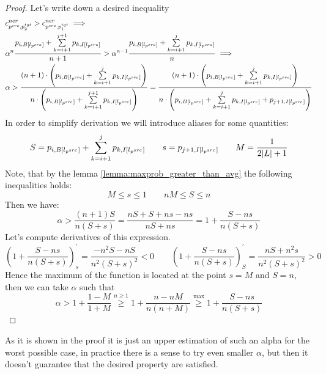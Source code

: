 \begin{proof} Let's write down a desired inequality
    \begin{align*}
         & c_{p^{src}, p_2^{tgt}}^{ner} > c_{p^{src}, p_1^{tgt}}^{ner} \implies \\
         & \alpha^{n}
        \frac{
            p_{i, B[l_{p^{src}}]} +
            \sum\limits_{k = i + 1}^{j + 1} p_{k, I[l_{p^{src}}]}
        }
        {n + 1} >
        \alpha^{n - 1}
        \frac{
            p_{i, B[l_{p^{src}}]} +
            \sum\limits_{k = i + 1}^{j} p_{k, I[l_{p^{src}}]}
        }
        {n}
        \implies                                                                \\
         & \alpha >
        \frac
        {(n+1) \cdot \left( p_{i, B[l_{p^{src}}]} +
            \sum\limits_{k = i + 1}^{j} p_{k, I[l_{p^{src}}]} \right)}
        {
            n \cdot \left( p_{i, B[l_{p^{src}}]} +
            \sum\limits_{k = i + 1}^{j + 1} p_{k, I[l_{p^{src}}]} \right)}
        =
        \frac
        {(n+1) \cdot \left( p_{i, B[l_{p^{src}}]} +
            \sum\limits_{k = i + 1}^{j} p_{k, I[l_{p^{src}}]} \right)}
        {
            n \cdot \left( p_{i, B[l_{p^{src}}]} +
            \sum\limits_{k = i + 1}^{j} p_{k, I[l_{p^{src}}]} + p_{j+1, I[l_{p^{src}}]} \right)}
    \end{align*}
    In order to simplify derivation we will introduce aliases for some quantities:
    \[
        S = p_{i, B[l_{p^{src}}]}  + \sum\limits_{k = i + 1}^{j} p_{k, I[l_{p^{src}}]} \qquad
        s = p_{j+1, I[l_{p^{src}}]} \qquad
        M = \frac{1}{2|L| + 1}
    \]
    Note, that by the lemma \ref{lemma:maxprob_greater_than_avg} the following
    inequalities holds:
    \begin{equation} \label{eq:ner_sum_ineq}
        M \leq s \leq 1 \qquad nM \leq S \leq n
    \end{equation}
    Then we have:
    \begin{equation*}
        \alpha > \frac{(n + 1) S}{n (S + s)} =
        \frac{nS + S + ns - ns}{nS + ns} =
        1 + \frac{S - ns}{n(S + s)}
    \end{equation*}
    Let's compute derivatives of this expression.
    \begin{equation*}
        \left( 1 + \frac{S - ns}{n(S + s)} \right)_s^{'} =
        \frac{-n^2S - nS}{n^2 (S + s)^2} < 0
        \qquad
        \left( 1 + \frac{S - ns}{n(S + s)} \right)_S^{'}
        = \frac{nS + n^2s}{n^2 (S + s)^2} > 0
    \end{equation*}
    Hence the maximum of the function is located at the point
    \( s = M \) and \( S = n \), then we can take \( \alpha \) such that
    \begin{equation*}
        \alpha > 1 + \frac{1 - M}{1 + M}
        \stackrel{n \geq 1}{\geq}
        1 + \frac{n - nM}{n(n + M)}
        \stackrel{\max}{\geq}
        1 + \frac{S - ns}{n(S + s)}
    \end{equation*}
\end{proof}
As it is shown in the proof it is just an upper estimation of such an alpha for the worst possible case,
in practice there is a sense to try even smaller \( \alpha \), but then it doesn't guarantee that the
desired property are satisfied.

